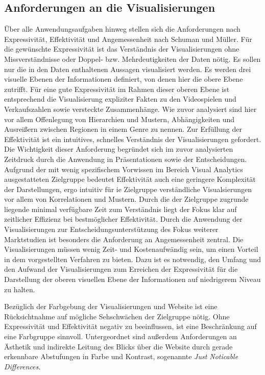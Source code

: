 \documentclass[usegeometry=true]{scrartcl}
\begin{document}
\subsection{Anforderungen an die Visualisierungen}
Über alle Anwendungsaufgaben hinweg stellen sich die Anforderungen nach Expressivität, Effektivität und Angemessenheit nach Schuman und Müller.%
Für die gewünschte Expressivität ist das Verständnis der Visualisierungen ohne Missverständnisse oder Doppel- bzw. Mehrdeutigkeiten der Daten nötig. 
Es sollen nur die in den Daten enthaltenen Aussagen visualisiert werden. 
Es werden drei visuelle Ebenen der Informationen definiert, von denen hier die obere Ebene zutrifft.%
Für eine gute Expressivität im Rahmen dieser oberen Ebene ist entsprechend die Visualisierung expliziter Fakten zu den Videospielen und Verkaufszahlen sowie versteckte Zusammenhänge. 
Wie zuvor analysiert sind hier vor allem Offenlegung von Hierarchien und Mustern, Abhängigkeiten und Ausreißern zwischen Regionen in einem Genre zu nennen.
Zur Erfüllung der Effektivität ist ein intuitives, schnelles Verständnis der Visualisierungen gefordert.
Die Wichtigkeit dieser Anforderung begründet sich im zuvor analysierten Zeitdruck durch die Anwendung in Präsentationen sowie der Entscheidungen.    
Aufgrund der mit wenig spezifischem Vorwissen im Bereich Visual Analytics ausgestatteten Zielgruppe bedeutet Effektivität auch eine geringere Komplexität der Darstellungen, ergo intuitiv für ie Zielgruppe verständliche Visualsierungen vor allem von Korrelationen und Mustern.
Durch die der Zielgruppe zugrunde liegende minimal verfügbare Zeit zum Verständnis liegt der Fokus klar auf zeitlicher Effizienz bei bestmöglicher Effektivität.
Durch die Anwendung der Visualisierungen zur Entscheidungsunterstützung des Fokus weiterer Marktstudien ist besonders die Anforderung an Angemessenheit zentral. 
Die Visualisierungen müssen wenig Zeit- und Kostenaufwändig sein, um einen Vorteil in dem vorgestellten Verfahren zu bieten. 
Dazu ist es notwendig, den Umfang und den Aufwand der Visualisierungen zum Erreichen der Expressivität für die Darstellung der oberen visuellen Ebene der Informationen auf niedrigerem Niveau zu halten.

Bezüglich der Farbgebung der Visualisierungen und Website ist eine Rücksichtnahme auf mögliche Sehschwächen der Zielgruppe nötig. 
Ohne Expressivität und Effektivität negativ zu beeinflussen, ist eine Beschränkung auf eine Farbgruppe sinnvoll. 
Untergeordnet sind außerdem Anforderungen an Ästhetik und indirekte Leitung des Blicks über die Website durch gerade erkennbare Abstufungen in Farbe und Kontrast, sogenannte \textit{Just Noticable Differences}.
\end{document}
